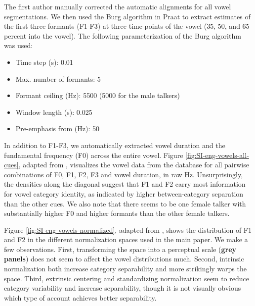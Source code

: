 \documentclass[preprint]{JASA}
\providecommand{\tightlist}{%
  \setlength{\itemsep}{0pt}\setlength{\parskip}{0pt}}
\begin{document}
The first author manually corrected the automatic alignments for all vowel segmentations. We then used the Burg algorithm in Praat \citep{boersma-weenink2022} to extract estimates of the first three formants (F1-F3) at three time points of the vowel (35, 50, and 65 percent into the vowel). The following parameterization of the Burg algorithm was used:

\begin{itemize}
\tightlist
\item
  Time step (s): 0.01
\item
  Max. number of formants: 5
\item
  Formant ceiling (Hz): 5500 (5000 for the male talkers)
\item
  Window length (s): 0.025
\item
  Pre-emphasis from (Hz): 50
\end{itemize}

In addition to F1-F3, we automatically extracted vowel duration and the fundamental frequency (F0) across the entire vowel. Figure \ref{fig:SI-eng-vowels-all-cues}, adapted from \citet{persson-jaeger2023}, visualizes the vowel data from the \citet{xie-jaeger2020} database for all pairwise combinations of F0, F1, F2, F3 and vowel duration, in raw Hz. Unsurprisingly, the densities along the diagonal suggest that F1 and F2 carry most information for vowel category identity, as indicated by higher between-category separation than the other cues. We also note that there seems to be one female talker with substantially higher F0 and higher formants than the other female talkers.

Figure \ref{fig:SI-eng-vowels-normalized}, adapted from \citet{persson-jaeger2023}, shows the distribution of F1 and F2 in the different normalization spaces used in the main paper. We make a few observations. First, transforming the space into a perceptual scale (\textbf{grey panels}) does not seem to affect the vowel distributions much. Second, intrinsic normalization both increase category separability and more strikingly warps the space. Third, extrinsic centering and standardizing normalization seem to reduce category variability and increase separability, though it is not visually obvious which type of account achieves better separability.
\end{document}
